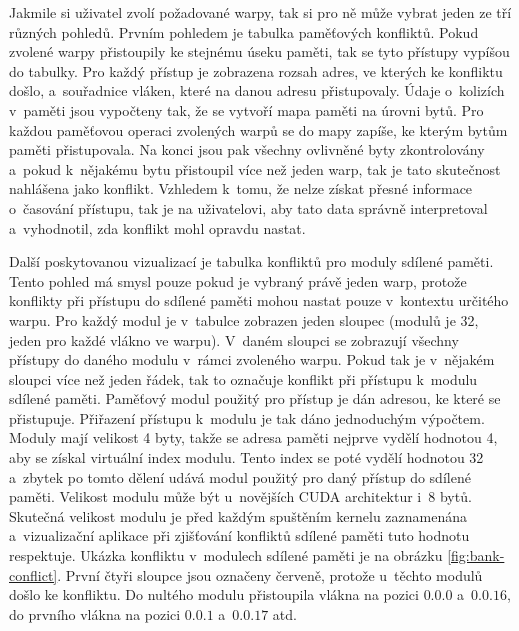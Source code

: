 
Jakmile si uživatel zvolí požadované warpy, tak si pro ně může vybrat jeden ze tří různých pohledů. Prvním pohledem je tabulka paměťových konfliktů. Pokud zvolené warpy přistoupily ke stejnému úseku paměti, tak se tyto přístupy vypíšou do tabulky. Pro každý přístup je zobrazena rozsah adres, ve kterých ke konfliktu došlo, a~souřadnice vláken, které na danou adresu přistupovaly. Údaje o~kolizích v~paměti jsou vypočteny tak, že se vytvoří mapa paměti na úrovni bytů. Pro každou paměťovou operaci zvolených warpů se do mapy zapíše, ke kterým bytům paměti přistupovala. Na konci jsou pak všechny ovlivněné byty zkontrolovány a~pokud k~nějakému bytu přistoupil více než jeden warp, tak je tato skutečnost nahlášena jako konflikt. Vzhledem k~tomu, že nelze získat přesné informace o~časování přístupu, tak je na uživatelovi, aby tato data správně interpretoval a~vyhodnotil, zda konflikt mohl opravdu nastat.

Další poskytovanou vizualizací je tabulka konfliktů pro moduly sdílené paměti. Tento pohled má smysl pouze pokud je vybraný právě jeden warp, protože konflikty při přístupu do sdílené paměti mohou nastat pouze v~kontextu určitého warpu. Pro každý modul je v~tabulce zobrazen jeden sloupec (modulů je 32, jeden pro každé vlákno ve warpu). V~daném sloupci se zobrazují všechny přístupy do daného modulu v~rámci zvoleného warpu. Pokud tak je v~nějakém sloupci více než jeden řádek, tak to označuje konflikt při přístupu k~modulu sdílené paměti. Paměťový modul použitý pro přístup je dán adresou, ke které se přistupuje. Přiřazení přístupu k~modulu je tak dáno jednoduchým výpočtem. Moduly mají velikost 4 byty, takže se adresa paměti nejprve vydělí hodnotou 4, aby se získal virtuální index modulu. Tento index se poté vydělí hodnotou 32 a~zbytek po tomto dělení udává modul použitý pro daný přístup do sdílené paměti. Velikost modulu může být u~novějších CUDA architektur i~8 bytů. Skutečná velikost modulu je před každým spuštěním kernelu zaznamenána a~vizualizační aplikace při zjišťování konfliktů sdílené paměti tuto hodnotu respektuje. Ukázka konfliktu v~modulech sdílené paměti je na obrázku \ref{fig:bank-conflict}. První čtyři sloupce jsou označeny červeně, protože u~těchto modulů došlo ke konfliktu. Do nultého modulu přistoupila vlákna na pozici $0.0.0$ a~$0.0.16$, do prvního vlákna na pozici $0.0.1$ a~$0.0.17$ atd.


